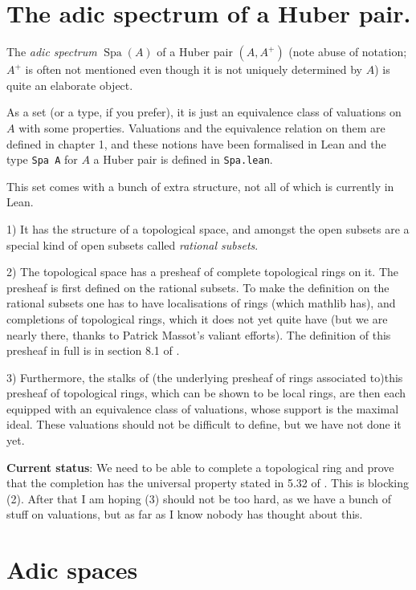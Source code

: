 \documentclass{amsart}
\DeclareMathOperator{\Spa}{Spa}
\theoremstyle{plain}
\theoremstyle{remark}
\begin{document}
\section{The adic spectrum of a Huber pair.}

The \emph{adic spectrum} $\Spa(A)$ of a Huber pair $(A,A^+)$ (note abuse of notation; $A^+$ is often not mentioned even though it is not uniquely determined by $A$) is quite an elaborate object.

As a set (or a type, if you prefer), it is just an equivalence class of valuations on $A$ with some properties. Valuations and the equivalence relation on them are defined in \cite{Wedhorn} chapter 1, and these notions have been formalised in Lean and the type {\tt Spa A} for $A$ a Huber pair is defined in {\tt Spa.lean}.

This set comes with a bunch of extra structure, not all of which is currently in Lean.

1) It has the structure of a topological space, and amongst the open subsets are a special kind of open subsets called \emph{rational subsets}.

2) The topological space has a presheaf of complete topological rings on it. The presheaf is first defined on the rational subsets. To make the definition on the rational subsets one has to have localisations of rings (which mathlib has), and completions of topological rings, which it does not yet quite have (but we are nearly there, thanks to Patrick Massot's valiant efforts). The definition of this presheaf in full is in section 8.1 of \cite{Wedhorn}.

3) Furthermore, the stalks of (the underlying presheaf of rings associated to)this presheaf of topological rings, which can be shown to be local rings, are then each equipped with an equivalence class of valuations, whose support is the maximal ideal. These valuations should not be difficult to define, but we have not done it yet.

{\bf Current status}: We need to be able to complete a topological ring and prove that the completion has the universal property stated in 5.32 of \cite{Wedhorn}. This is blocking (2). After that I am hoping (3) should not be too hard, as we have a bunch of stuff on valuations, but as far as I know nobody has thought about this.

\section{Adic spaces}
\end{document}
